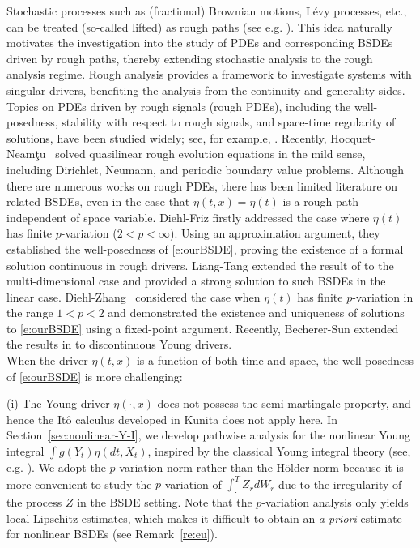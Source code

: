 \documentclass[11pt,reqno]{amsart}
\numberwithin{equation}{section}
\begin{document}
Stochastic processes such as (fractional) Brownian motions, L\'evy processes, etc., can be treated (so-called lifted) as rough paths (see e.g. \cite[Theorem 15.33]{FrizVictoir}). This idea naturally motivates the investigation into the study of PDEs and corresponding BSDEs driven by rough paths, thereby extending stochastic analysis to the rough analysis regime. Rough analysis provides a framework to investigate systems with singular drivers, benefiting the analysis from the continuity and generality sides. 
Topics on PDEs driven by rough signals (rough PDEs), including the well-posedness, stability with respect to rough signals, and space-time regularity of solutions, have been studied widely;
see, for example, \cite{Caruana2009,Gubinelli2010,caruana2011rough,Friz2014a,Diehl2017b,BuckdahnZhang,Liang2024a,Bugini2025a}. Recently, Hocquet-Neamţu~\cite{Hocquet2024} solved quasilinear rough evolution equations in the mild sense, including Dirichlet, Neumann, and periodic boundary value problems. 
Although there are numerous works on rough PDEs, there has been limited literature on related BSDEs, even in the case that $\eta(t,x)=\eta(t)$ is a rough path independent of space variable. Diehl-Friz \cite{DiehlFriz} firstly addressed the case where $\eta(t)$ has finite $p$-variation ($2<p<\infty$).
Using an approximation argument, they established the well-posedness of \eqref{e:ourBSDE}, proving the existence of a formal solution continuous in rough drivers. Liang-Tang \cite{liang2023multidimensional} extended the result of \cite{DiehlFriz} to the multi-dimensional case and provided a strong solution to such BSDEs in the linear case. Diehl-Zhang~\cite{DiehlZhang} considered the case when $\eta(t)$ has finite $p$-variation in the range $1<p<2$ and demonstrated the existence and uniqueness of solutions to \eqref{e:ourBSDE} using a fixed-point argument. Recently, Becherer-Sun \cite{Becherer2025} extended the results in \cite{DiehlZhang} to discontinuous Young drivers.\\

 
When the driver $\eta(t,x)$ is a function of both time and space, the well-posedness of \eqref{e:ourBSDE} is more challenging:

(i) The Young driver $\eta(\cdot,x)$ does not possess the semi-martingale property, and hence the It\^o calculus developed in Kunita \cite{kunita1997stochastic} does not apply here. In Section~\ref{sec:nonlinear-Y-I}, we develop pathwise analysis for the nonlinear Young integral  $\int g(Y_t) \eta(dt, X_t)$, inspired  by the classical Young integral theory (see, e.g. \cite{young1936, lyons1994differential,Catellier-Gubinelli-2016,HuLe, DiehlZhang,galeati2021nonlinear}).  We adopt the $p$-variation norm rather than the H\"older norm because it is more convenient to study the $p$-variation of $ \int_{\cdot}^{T}Z_{r}dW_{r}$ due to the irregularity of the process $Z$ in the BSDE setting. Note that the $p$-variation analysis only yields local Lipschitz estimates, which makes it difficult to obtain an {\it a priori} estimate for nonlinear BSDEs (see Remark~\ref{re:eu}).
\end{document}
